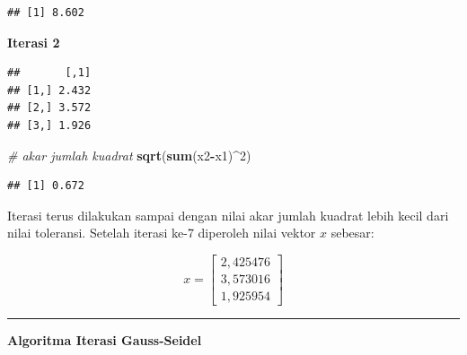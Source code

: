 \documentclass[]{book}
\newenvironment{Shaded}{\begin{snugshade}}{\end{snugshade}}
\newcommand{\CommentTok}[1]{\textcolor[rgb]{0.56,0.35,0.01}{\textit{#1}}}
\newcommand{\DecValTok}[1]{\textcolor[rgb]{0.00,0.00,0.81}{#1}}
\newcommand{\KeywordTok}[1]{\textcolor[rgb]{0.13,0.29,0.53}{\textbf{#1}}}
\newcommand{\NormalTok}[1]{#1}
\newcommand{\OperatorTok}[1]{\textcolor[rgb]{0.81,0.36,0.00}{\textbf{#1}}}
\newcommand{\StringTok}[1]{\textcolor[rgb]{0.31,0.60,0.02}{#1}}
\theoremstyle{definition}
\theoremstyle{definition}
\theoremstyle{definition}
\theoremstyle{remark}
\begin{document}
\begin{verbatim}
## [1] 8.602
\end{verbatim}

\textbf{Iterasi 2}

\begin{Shaded}
\end{Shaded}

\begin{verbatim}
##       [,1]
## [1,] 2.432
## [2,] 3.572
## [3,] 1.926
\end{verbatim}

\begin{Shaded}
\begin{Highlighting}[]
\CommentTok{# akar jumlah kuadrat}
\KeywordTok{sqrt}\NormalTok{(}\KeywordTok{sum}\NormalTok{(x2}\OperatorTok{-}\NormalTok{x1)}\OperatorTok{^}\DecValTok{2}\NormalTok{)}
\end{Highlighting}
\end{Shaded}

\begin{verbatim}
## [1] 0.672
\end{verbatim}

Iterasi terus dilakukan sampai dengan nilai akar jumlah kuadrat lebih kecil dari nilai toleransi. Setelah iterasi ke-7 diperoleh nilai vektor \(x\) sebesar:

\[
x = \begin{bmatrix}
     2,425476     \\[0.3em]
     3,573016     \\[0.3em]
     1,925954
\end{bmatrix}
\]

\begin{center}\rule{0.5\linewidth}{\linethickness}\end{center}

\textbf{Algoritma Iterasi Gauss-Seidel}
\end{document}
